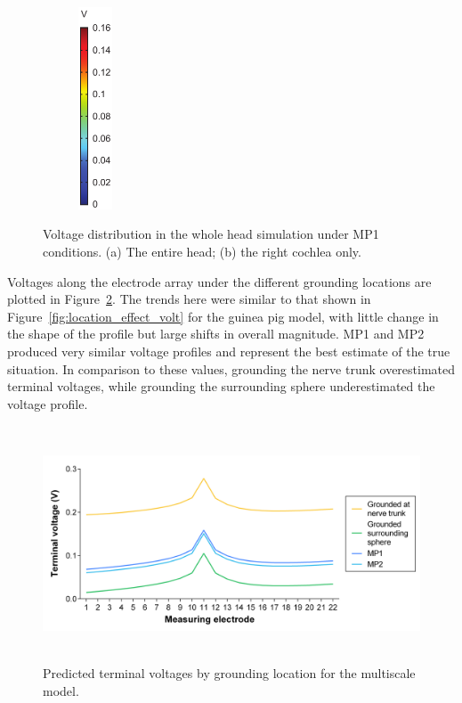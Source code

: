\begin{figure}
    \begin{subfigure}[t]{0.1\textwidth}
        \centering
        \includegraphics[height=6cm]{Simulations/BCs/legend_coh_volt}
    \end{subfigure}%
    
	\caption[Voltage distribution in the whole head simulation]{Voltage
	distribution in the whole head simulation under MP1 conditions. (a) The entire
	head; (b) the right cochlea only.}
	\label{fig:bc_volt_dist}
\end{figure}

Voltages along the electrode array under the different grounding locations are
plotted in Figure~\ref{fig:heather_coh_voltages}. The trends here were similar
to that shown in Figure~\ref{fig:location_effect_volt} for the guinea pig
model, with little change in the shape of the profile but large shifts in overall
magnitude. MP1 and MP2 produced very similar voltage profiles and represent the
best estimate of the true \invivo{} situation. In comparison to these values,
grounding the nerve trunk overestimated terminal voltages, while grounding the
surrounding sphere underestimated the voltage profile.

\begin{figure}
    \centering
	\includegraphics[height=7cm]{Simulations/BCs/heather_voltages}
	\caption[Predicted \insilico{} terminal voltages by grounding
	location]{Predicted \insilico{} terminal voltages by grounding location for
	the multiscale model.}
	\label{fig:heather_coh_voltages}
\end{figure}

